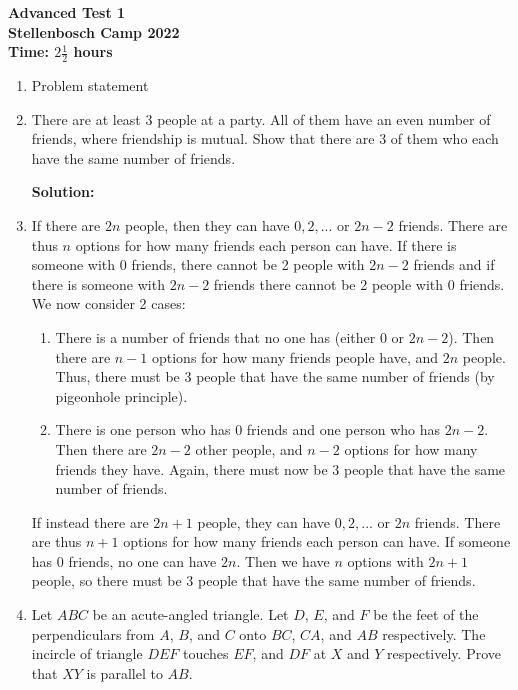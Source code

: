 \documentclass{article}
\begin{document}
\thispagestyle{empty}

\begin{center}
  \textbf{\Large Advanced Test 1}
  \\ \vspace{1em}
  \textbf{\large Stellenbosch Camp 2022}
  \\ \vspace{1em}
  \textbf{\large Time: $2\frac{1}{2}$ hours}
\end{center}

\bigskip

\begin{enumerate}[itemsep=\fill]

\item %
Problem statement


\item %
There are at least 3 people at a party. All of them have an even number of friends, where friendship is mutual. Show that there are 3 of them who each have the same number of friends.

\textbf{Solution:} \item If there are $2n$ people, then they can have $0,2,...$ or $2n-2$ friends. There are thus $n$ options for how many friends each person can have. If there is someone with 0 friends, there cannot be 2 people with $2n-2$ friends and if there is someone with $2n-2$ friends there cannot be 2 people with 0 friends. We now consider 2 cases:
\begin{enumerate}
\item There is a number of friends that no one has (either 0 or $2n-2$). Then there are $n-1$ options for how many friends people have, and $2n$ people. Thus, there must be 3 people that have the same number of friends (by pigeonhole principle).
\item There is one person who has 0 friends and one person who has $2n-2$. Then there are $2n-2$ other people, and $n-2$ options for how many friends they have. Again, there must now be 3 people that have the same number of friends.
\end{enumerate}
If instead there are $2n+1$ people, they can have $0,2,...$ or $2n$ friends. There are thus $n+1$ options for how many friends each person can have. If someone has 0 friends, no one can have $2n$. Then we have $n$ options with $2n+1$ people, so there must be 3 people that have the same number of friends.


\item %
Let $ABC$ be an acute-angled triangle. Let $D$, $E$, and $F$ be the feet of the perpendiculars from $A$, $B$, and $C$ onto $BC$, $CA$, and $AB$ respectively. The incircle of triangle $DEF$ touches $EF$, and $DF$ at $X$ and $Y$ respectively. Prove that $XY$ is parallel to $AB$.


\end{enumerate}
\end{document}
